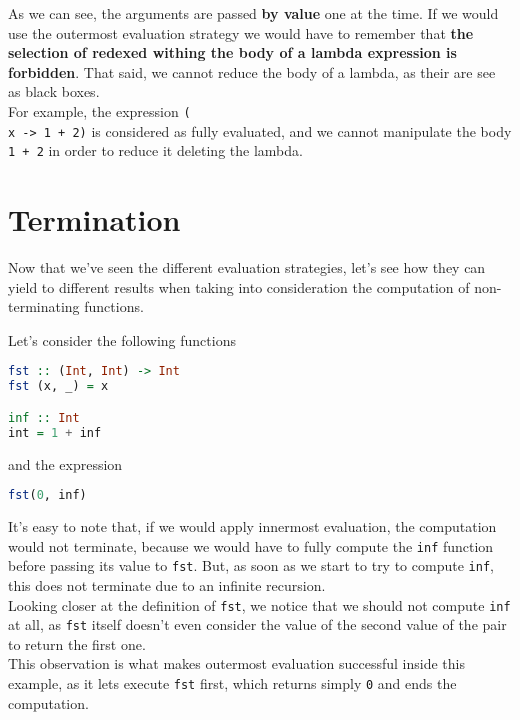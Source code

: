 As we can see, the arguments are passed \textbf{by value} one at the time. If we would use the outermost evaluation strategy we would have to remember that \textbf{the selection of redexed withing the body of a lambda expression is forbidden}. That said, we cannot reduce the body of a lambda, as their are see as black boxes. \\
For example, the expression \texttt{(\\x -> 1 + 2)} is considered as fully evaluated, and we cannot manipulate the body \texttt{1 + 2} in order to reduce it deleting the lambda.

\section{Termination}
Now that we've seen the different evaluation strategies, let's see how they can yield to different results when taking into consideration the computation of non-terminating functions. 
\linebreak \linebreak

Let's consider the following functions

\begin{lstlisting}[language=haskell]
fst :: (Int, Int) -> Int
fst (x, _) = x

inf :: Int
int = 1 + inf
\end{lstlisting}

and the expression

\begin{lstlisting}[language=haskell]
fst(0, inf)
\end{lstlisting}

It's easy to note that, if we would apply innermost evaluation, the computation would not terminate, because we would have to fully compute the \texttt{inf} function before passing its value to \texttt{fst}. But, as soon as we start to try to compute \texttt{inf}, this does not terminate due to an infinite recursion. \\
Looking closer at the definition of \texttt{fst}, we notice that we should not compute \texttt{inf} at all, as \texttt{fst} itself doesn't even consider the value of the second value of the pair to return the first one. \\
This observation is what makes outermost evaluation successful inside this example, as it lets execute \texttt{fst} first, which returns simply \texttt{0} and ends the computation. 
\linebreak \linebreak

